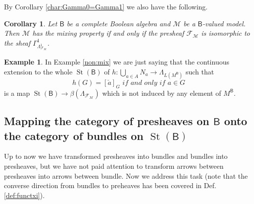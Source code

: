 \documentclass[11pt]{amsart}
\newcommand{\F}{\mathcal{F}}
\theoremstyle{plain}
\newtheorem{corollary}[theorem]{Corollary}
\theoremstyle{definition}
\newtheorem{example}[theorem]{Example}
\theoremstyle{plain}
\theoremstyle{remark}
\newcommand{\M}{\mathcal{M}}
\DeclareMathOperator{\St}{St}
\newcommand{\bool}[1]{\mathsf{#1}}
\newcommand{\0}{\mathsf{0}}
\renewcommand{\1}{\mathsf{1}}
\renewcommand{\2}{\mathsf{2}}
\theoremstyle{definition}
\begin{document}
By Corollary \ref{char:Gamma0=Gamma1} we also have the following.
\begin{corollary}
 Let $\bool{B}$ be a complete Boolean algebra and $\M$ be a $\bool{B}$-valued model.
Then $\M$ has the mixing property if and only if the presheaf $\F_\M$ is isomorphic to the sheaf $\Gamma^1_{\Lambda^1_{\F_\M}}$.
\end{corollary}

\begin{example}\label{ex:fullnotimplmix2}
In Example \ref{non:mix} we are just saying that the continuous extension to the whole $\St(\bool{B})$ of $h:\bigcup_{a\in A}N_a\to \Lambda_{L(M^{\bool{B}})}$ such that \[h(G)=[\check{a}]_G\textit{ if and only if }a\in G\]
is a map $\St(\bool{B})\to\beta(\Lambda_{\F_\M})$ which is not induced by any element of $M^{\bool{B}}$.
\end{example}


\subsection{Mapping the category of presheaves on $\bool{B}$ onto the category of bundles on $\St(\bool{B})$}\label{subsec:adjunctions}

Up to now we have transformed presheaves into bundles and bundles into presheaves, but we have not paid attention to transform arrows between presheaves into arrows between bundle. Now we address this task  (note that the converse direction from bundles to preheaves has been covered in Def. \ref{def:functxi}).
\end{document}
